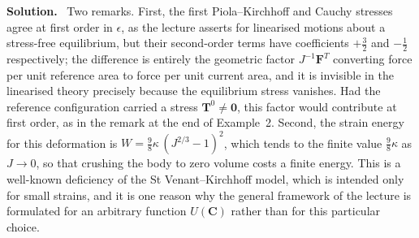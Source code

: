 \documentclass[a4paper,12pt]{paper}
\newenvironment{solution}{\par\noindent\textbf{Solution.}\ }{\par\medskip}
\begin{document}
\begin{solution}
Two remarks. First, the first Piola--Kirchhoff and Cauchy stresses agree at first order in
$\epsilon$, as the lecture asserts for linearised motions about a stress-free equilibrium, but their
second-order terms have coefficients $+\frac{3}{2}$ and $-\frac{1}{2}$ respectively; the difference is
entirely the geometric factor $J^{-1}\mathbf{F}^{T}$ converting force per unit reference area to
force per unit current area, and it is invisible in the linearised theory precisely because the
equilibrium stress vanishes. Had the reference configuration carried a stress $\mathbf{T}^{0}\neq\mathbf{0}$,
this factor would contribute at first order, as in the remark at the end of Example~2. Second, the
strain energy for this deformation is $W=\frac{9}{8}\kappa\,(J^{2/3}-1)^{2}$, which tends to the
finite value $\frac{9}{8}\kappa$ as $J\rightarrow0$, so that crushing the body to zero volume costs a
finite energy. This is a well-known deficiency of the St Venant--Kirchhoff model, which is
intended only for small strains, and it is one reason why the general framework of the lecture is
formulated for an arbitrary function $U(\mathbf{C})$ rather than for this particular choice.
\end{solution}
\end{document}
